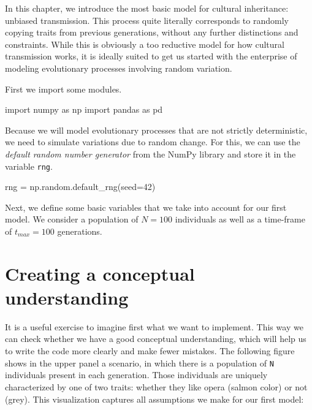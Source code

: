 \documentclass[
  a4paperpaper,
  ,captions=tableheading
]{scrbook}
\newenvironment{Shaded}{\begin{snugshade}}{\end{snugshade}}
\newcommand{\DecValTok}[1]{\textcolor[rgb]{0.68,0.00,0.00}{#1}}
\newcommand{\ImportTok}[1]{\textcolor[rgb]{0.00,0.46,0.62}{#1}}
\newcommand{\NormalTok}[1]{\textcolor[rgb]{0.00,0.23,0.31}{#1}}
\newcommand{\OperatorTok}[1]{\textcolor[rgb]{0.37,0.37,0.37}{#1}}
\begin{document}
In this chapter, we introduce the most basic model for cultural
inheritance: unbiased transmission. This process quite literally
corresponds to randomly copying traits from previous generations,
without any further distinctions and constraints. While this is
obviously a too reductive model for how cultural transmission works, it
is ideally suited to get us started with the enterprise of modeling
evolutionary processes involving random variation.

First we import some modules.

\begin{Shaded}
\begin{Highlighting}[]
\ImportTok{import}\NormalTok{ numpy }\ImportTok{as}\NormalTok{ np}
\ImportTok{import}\NormalTok{ pandas }\ImportTok{as}\NormalTok{ pd}
\end{Highlighting}
\end{Shaded}

Because we will model evolutionary processes that are not strictly
deterministic, we need to simulate variations due to random change. For
this, we can use the \emph{default random number generator} from the
NumPy library and store it in the variable \texttt{rng}.

\begin{Shaded}
\begin{Highlighting}[]
\NormalTok{rng }\OperatorTok{=}\NormalTok{ np.random.default\_rng(seed}\OperatorTok{=}\DecValTok{42}\NormalTok{)}
\end{Highlighting}
\end{Shaded}

Next, we define some basic variables that we take into account for our
first model. We consider a population of \(N=100\) individuals as well
as a time-frame of \(t_{max}=100\) generations.

\hypertarget{creating-a-conceptual-understanding}{%
\section{Creating a conceptual
understanding}\label{creating-a-conceptual-understanding}}

It is a useful exercise to imagine first what we want to implement. This
way we can check whether we have a good conceptual understanding, which
will help us to write the code more clearly and make fewer mistakes. The
following figure shows in the upper panel a scenario, in which there is
a population of \texttt{N} individuals present in each generation. Those
individuals are uniquely characterized by one of two traits: whether
they like opera (salmon color) or not (grey). This visualization
captures all assumptions we make for our first model:
\end{document}
